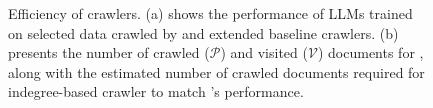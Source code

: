 \begin{figure}[t]
    \centering
    \caption{Efficiency of crawlers. (a) shows the performance of LLMs trained on selected data crawled by \ours{} and extended baseline crawlers. (b) presents the number of crawled ($\mathcal{P}$) and visited ($\mathcal{V}$) documents for \ours{}, along with the estimated number of crawled documents required for indegree-based crawler to match \ours{}’s performance. 
    }
    \label{fig:crawl_efficiency}
\end{figure}